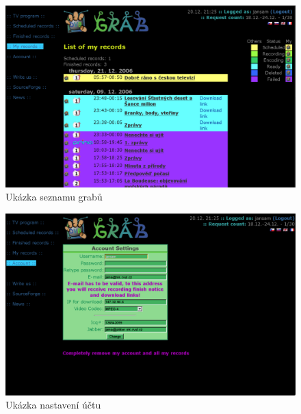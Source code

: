 \documentclass[11pt,twoside,a4paper]{dp_format}%
\begin{document}
\begin{figure}[ht]
\begin{center}
\includegraphics[width=12cm]{images/scrSeznam}
\caption{Ukázka seznamu grabů}
\label{fig:scr3}
\end{center}
\end{figure}

\begin{figure}[ht]
\begin{center}
\includegraphics[width=12cm]{images/scrNastaveni}
\caption{Ukázka nastavení účtu}
\label{fig:scr4}
\end{center}
\end{figure}

\vfil
\pagebreak

\cleardoublepage


\cleardoublepage


\cleardoublepage


\cleardoublepage
\end{document}
